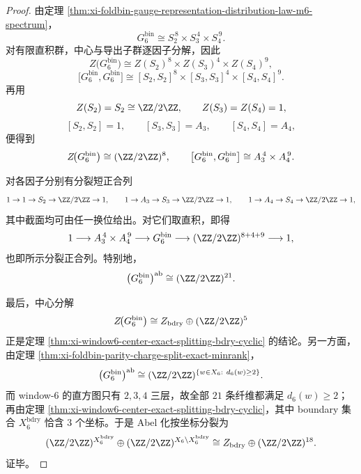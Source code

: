 \begin{proof}
由定理 \ref{thm:xi-foldbin-gauge-representation-distribution-law-m6-spectrum}，
\[
G_6^{\mathrm{bin}}\cong S_2^{\,8}\times S_3^{\,4}\times S_4^{\,9}.
\]
对有限直积群，中心与导出子群逐因子分解，因此
\[
Z\!\bigl(G_6^{\mathrm{bin}}\bigr)
\cong
Z(S_2)^8\times Z(S_3)^4\times Z(S_4)^9,
\]
\[
\bigl[G_6^{\mathrm{bin}},G_6^{\mathrm{bin}}\bigr]
\cong
[S_2,S_2]^8\times [S_3,S_3]^4\times [S_4,S_4]^9.
\]
再用
\[
Z(S_2)=S_2\cong \ZZ/2\ZZ,\qquad Z(S_3)=Z(S_4)=1,
\]
\[
[S_2,S_2]=1,\qquad [S_3,S_3]=A_3,\qquad [S_4,S_4]=A_4,
\]
便得到
\[
Z\!\bigl(G_6^{\mathrm{bin}}\bigr)\cong (\ZZ/2\ZZ)^8,
\qquad
\bigl[G_6^{\mathrm{bin}},G_6^{\mathrm{bin}}\bigr]\cong A_3^{\,4}\times A_4^{\,9}.
\]

对各因子分别有分裂短正合列
\[
1\to 1\to S_2\to \ZZ/2\ZZ\to 1,
\qquad
1\to A_3\to S_3\to \ZZ/2\ZZ\to 1,
\qquad
1\to A_4\to S_4\to \ZZ/2\ZZ\to 1,
\]
其中截面均可由任一换位给出。对它们取直积，即得
\[
1\longrightarrow A_3^{\,4}\times A_4^{\,9}
\longrightarrow G_6^{\mathrm{bin}}
\longrightarrow (\ZZ/2\ZZ)^{8+4+9}
\longrightarrow 1,
\]
也即所示分裂正合列。特别地，
\[
\bigl(G_6^{\mathrm{bin}}\bigr)^{\mathrm{ab}}\cong (\ZZ/2\ZZ)^{21}.
\]

最后，中心分解
\[
Z\!\bigl(G_6^{\mathrm{bin}}\bigr)\cong Z_{\mathrm{bdry}}\oplus (\ZZ/2\ZZ)^5
\]
正是定理 \ref{thm:xi-window6-center-exact-splitting-bdry-cyclic} 的结论。另一方面，由定理 \ref{thm:xi-foldbin-parity-charge-split-exact-minrank}，
\[
\bigl(G_6^{\mathrm{bin}}\bigr)^{\mathrm{ab}}
\cong
(\ZZ/2\ZZ)^{\{w\in X_6:\ d_6(w)\ge 2\}}.
\]
而 window-\(6\) 的直方图只有 \(2,3,4\) 三层，故全部 \(21\) 条纤维都满足 \(d_6(w)\ge 2\)；再由定理 \ref{thm:xi-window6-center-exact-splitting-bdry-cyclic}，其中 boundary 集合 \(X_6^{\mathrm{bdry}}\) 恰含 \(3\) 个坐标。于是 Abel 化按坐标分裂为
\[
(\ZZ/2\ZZ)^{X_6^{\mathrm{bdry}}}\oplus (\ZZ/2\ZZ)^{X_6\setminus X_6^{\mathrm{bdry}}}
\cong
Z_{\mathrm{bdry}}\oplus (\ZZ/2\ZZ)^{18}.
\]
证毕。
\end{proof}

